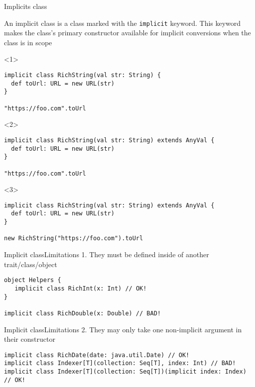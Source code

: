 \documentclass[aspectratio=169]{beamer}
\begin{document}
\begin{frame}[fragile]{Implicits class}
\begin{block}{}
   An \alert{implicit class}  is a class marked with the \texttt{implicit} keyword. This keyword
   makes the class’s primary constructor available for implicit conversions when the class is in
   scope
\end{block}
\bigskip
\begin{onlyenv}<1>
  \begin{verbatim}
implicit class RichString(val str: String) {
  def toUrl: URL = new URL(str)
}

"https://foo.com".toUrl
\end{verbatim}
\end{onlyenv}
\begin{onlyenv}<2>
  \begin{verbatim}
implicit class RichString(val str: String) extends AnyVal {
  def toUrl: URL = new URL(str)
}

"https://foo.com".toUrl
\end{verbatim}
\end{onlyenv}
\begin{onlyenv}<3>
  \begin{verbatim}
implicit class RichString(val str: String) extends AnyVal {
  def toUrl: URL = new URL(str)
}

new RichString("https://foo.com").toUrl
\end{verbatim}
\end{onlyenv}
\end{frame}

\begin{frame}[fragile]{Implicit class}{Limitations}
1. They must be defined inside of another trait/class/object
\bigskip
\begin{verbatim}
object Helpers {
   implicit class RichInt(x: Int) // OK!
}

implicit class RichDouble(x: Double) // BAD!
\end{verbatim}
\end{frame}


\begin{frame}[fragile]{Implicit class}{Limitations}
2. They may only take one non-implicit argument in their constructor
\bigskip
\begin{verbatim}
implicit class RichDate(date: java.util.Date) // OK!
implicit class Indexer[T](collection: Seq[T], index: Int) // BAD!
implicit class Indexer[T](collection: Seq[T])(implicit index: Index) // OK!
\end{verbatim}
\end{frame}
\end{document}
